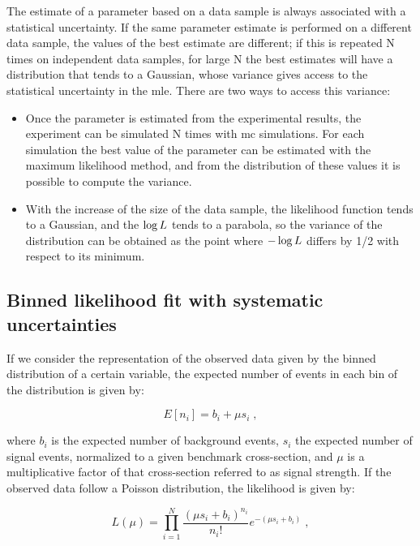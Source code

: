 The estimate of a parameter based on a data sample is always associated with a statistical uncertainty.
If the same parameter estimate is performed on a different data sample, the values of the best estimate are different;
if this is repeated N times on independent data samples, for large N the best estimates will have a distribution that tends to a Gaussian, 
whose variance gives access to the statistical uncertainty in the \gls{mle}. There are two ways to access this variance:

\begin{itemize}

\item Once the parameter is estimated from the experimental results, the experiment can be simulated N times with \gls{mc}  simulations. For each simulation the best value of the parameter can be estimated with the maximum likelihood method, and from the distribution of these values it is possible to compute the variance.

\item With the increase of the size of the data sample, the likelihood function tends to a Gaussian, and the $\log{L}$ tends to a parabola, so the variance of the distribution can be obtained as the point where $-\log{L}$ differs by 1/2 with respect to its minimum.

\end{itemize}


\subsection{Binned likelihood fit with systematic uncertainties}

If we consider the representation of the observed data given by the binned distribution of a certain variable, the expected number of events in each bin of the distribution is given by:

\begin{equation}
\label{eq:stat:exp}
E[n_i] = b_i + \mu s_i  \; ,
\end{equation}

\noindent where $b_i$ is the expected number of background events, $s_i$ the expected number of signal events, normalized to a given benchmark cross-section, and $\mu$ is a multiplicative factor of that cross-section referred to as signal strength.
If the observed data follow a Poisson distribution, the likelihood is given by:

\begin{equation}
\label{eq:stat:lik_no_sys}
L(\mu) =
\prod_{i=1}^N \frac{ (\mu s_{i} +
b_{i} )^{n_{i}} }{ n_{i}! }
e^{- (\mu s_{i} + b_{i}) } \; ,
\end{equation}

